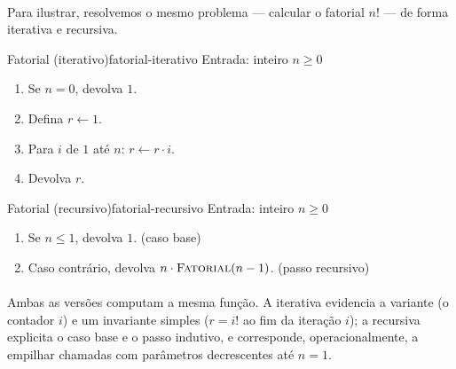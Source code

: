 \documentclass[12pt,a4paper]{article}
\def\emph#1{#1}%
\begin{document}
\paragraph{}
Para ilustrar, resolvemos o mesmo problema — calcular o fatorial \(n!\) — de forma \emph{iterativa} e \emph{recursiva}.

\begin{algobox}{Fatorial (iterativo)}{fatorial-iterativo}
Entrada: inteiro \(n\ge 0\)
\begin{enumerate}\setlength{\itemsep}{2pt}
    \item Se \(n=0\), devolva \(1\).
    \item Defina \(r\leftarrow 1\).
    \item Para \(i\) de \(1\) até \(n\): \(r\leftarrow r\cdot i\).
    \item Devolva \(r\).
\end{enumerate}
\end{algobox}

\begin{algobox}{Fatorial (recursivo)}{fatorial-recursivo}
Entrada: inteiro \(n\ge 0\)
\begin{enumerate}\setlength{\itemsep}{2pt}
    \item Se \(n\le 1\), devolva \(1\). \hfill (caso base)
    \item Caso contrário, devolva \(n\cdot \textsc{Fatorial}(n-1)\). \hfill (passo recursivo)
\end{enumerate}
\end{algobox}

\paragraph{}
Ambas as versões computam a mesma função. A iterativa evidencia a \emph{variante} (o contador \(i\)) e um \emph{invariante} simples (\(r= i!\) ao fim da iteração \(i\)); a recursiva explicita o \emph{caso base} e o \emph{passo indutivo}, e corresponde, operacionalmente, a empilhar chamadas com parâmetros decrescentes até \(n=1\).    
\end{document}

